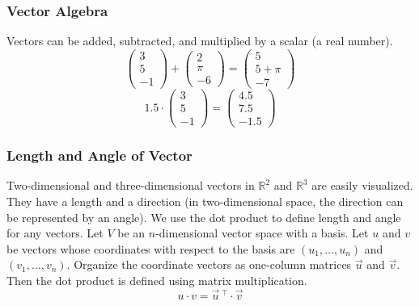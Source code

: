 \documentclass[xcolor=dvipsnames]{beamer}
\begin{document}
\begin{frame}
  \frametitle{Vector Algebra}
  Vectors can be added, subtracted, and multiplied by a scalar (a real
  number).
  \begin{equation}
    \label{eq:kaepuema}
    \left(
    \begin{array}{c}
      3 \\
      5 \\
      -1
    \end{array}\right)+
  \left(
    \begin{array}{c}
      2 \\
      \pi \\
      -6
    \end{array}\right)=
  \left(
    \begin{array}{c}
      5 \\
      5+\pi \\
      -7
    \end{array}\right)
  \end{equation}
  \begin{equation}
    \label{eq:kemodaim}
    1.5\cdot\left(
    \begin{array}{c}
      3 \\
      5 \\
      -1
    \end{array}\right)=
  \left(
    \begin{array}{c}
      4.5 \\
      7.5 \\
      -1.5
    \end{array}\right)
  \end{equation}
\end{frame}

\begin{frame}
  \frametitle{Length and Angle of Vector}
  Two-dimensional and three-dimensional vectors in $\mathbb{R}^{2}$
  and $\mathbb{R}^{3}$ are easily visualized. They have a length and a
  direction (in two-dimensional space, the direction can be
  represented by an angle). We use the dot product to define length
  and angle for any vectors. Let $V$ be an $n$-dimensional vector
  space with a basis. Let $u$ and $v$ be vectors whose coordinates
  with respect to the basis are $(u_{1},{\ldots},u_{n})$ and
  $(v_{1},{\ldots},v_{n})$. Organize the coordinate vectors as
  one-column matrices $\vec{u}$ and $\vec{v}$. Then the dot product is
  defined using matrix multiplication.
  \begin{equation}
    \label{eq:emiehoij}
    u\cdot{}v=\vec{u}\,^{\intercal}\cdot\vec{v}
  \end{equation}
\end{frame}
\end{document}
